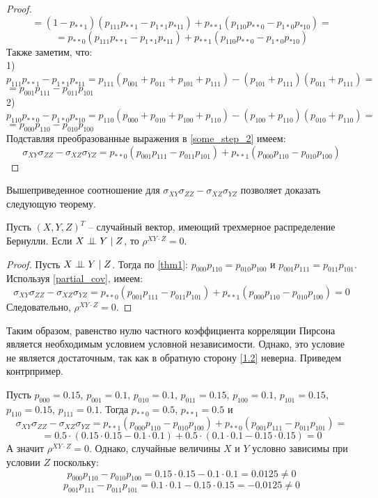 \begin{proof}
$$    $$
    $$
        =(1-p_{**1})(p_{111}p_{**1}-p_{1*1}p_{*11})+p_{**1}(p_{110}p_{**0}-p_{1*0}p_{*10})=
    $$
    \begin{equation}\label{some_step_2}
        =p_{**0}(p_{111}p_{**1}-p_{1*1}p_{*11})+p_{**1}(p_{110}p_{**0}-p_{1*0}p_{*10})
    \end{equation}
    Также заметим, что:\\
    1) $
        p_{111}p_{**1}-p_{1*1}p_{*11} = p_{111}(p_{001}+p_{011}+p_{101}+p_{111})-
        (p_{101}+p_{111})(p_{011}+p_{111})=
    $
    $
        = p_{001}p_{111}-p_{011}p_{101}
    $
    \\
    2) $
        p_{110}p_{**0}-p_{1*0}p_{*10}=
        p_{110}(p_{000}+p_{010}+p_{100}+p_{110})-(p_{100}+p_{110})(p_{010}+p_{110})=
    $
    $
        =p_{000}p_{110}-p_{010}p_{100}
    $\\
    Подставляя преобразованные выражения в \eqref{some_step_2} имеем:
    $$
    \sigma_{XY} \sigma_{ZZ} - \sigma_{XZ} \sigma_{YZ} = p_{**0}(p_{001}p_{111}-p_{011}p_{101}) + p_{**1} (p_{000}p_{110}-p_{010}p_{100})
    $$
\end{proof}
Вышеприведенное соотношение для $\sigma_{XY} \sigma_{ZZ} - \sigma_{XZ} \sigma_{YZ}$ позволяет доказать следующую теорему.
\begin{theorem}\label{1.2}
    Пусть $(X,Y,Z)^T$ -- случайный вектор, имеющий трехмерное распределение Бернулли.
    Если $X \perp\!\!\!\perp Y \mid Z$, то $\rho^{XY \cdot Z}=0$.
\end{theorem}
\begin{proof}
    Пусть $X \perp\!\!\!\perp Y \mid Z$. Тогда по \autoref{thm1}:
    $p_{000}p_{110}=p_{010}p_{100}$ и 
    $p_{001}p_{111}=p_{011}p_{101}$.
    Используя \autoref{partial_cov}, имеем:
    $$
    \sigma_{XY} \sigma_{ZZ} - \sigma_{XZ} \sigma_{YZ}=p_{**0}(p_{001}p_{111}-p_{011}p_{101}) + p_{**1} (p_{000}p_{110}-p_{010}p_{100})= 0
    $$
    Следовательно, $\rho^{XY \cdot Z}=0$.
\end{proof}
Таким образом, равенство нулю частного коэффициента корреляции Пирсона является необходимым условием условной независимости.
Однако, это условие не является достаточным, так как в обратную сторону \autoref{1.2} неверна. Приведем контрпример.
\begin{example}
    Пусть $p_{000}=0.15$, $p_{001}=0.1$, $p_{010}=0.1$, $p_{011}=0.15$, $p_{100}=0.1$, $p_{101}=0.15$, $p_{110}=0.15$, $p_{111}=0.1$.
    Тогда $p_{**0}=0.5$, $p_{**1}=0.5$ и
    $$\sigma_{XY} \sigma_{ZZ} - \sigma_{XZ} \sigma_{YZ} = p_{**1}(p_{000}p_{110}-p_{010}p_{100}) + p_{**0}(p_{001}p_{111}-p_{011}p_{101})=$$
    $$=0.5 \cdot (0.15 \cdot 0.15 - 0.1 \cdot 0.1) + 0.5 \cdot (0.1 \cdot 0.1 - 0.15 \cdot 0.15) = 0$$
    А значит $\rho^{XY\cdot Z}=0$.
    Однако, случайные величины $X$ и $Y$ условно зависимы при условии $Z$ поскольку:
    $$
        p_{000}p_{110}-p_{010}p_{100}=0.15 \cdot 0.15 - 0.1 \cdot 0.1 = 0.0125 \neq 0
    $$
    $$
        p_{001}p_{111}-p_{011}p_{101}=0.1 \cdot 0.1 - 0.15 \cdot 0.15 = -0.0125 \neq 0
    $$
\end{example}


